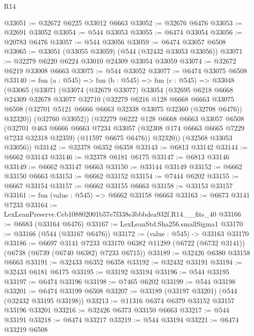 \begin{lexlean}{R14}
\begin{coremodule}
@33051 := @32672 @6225 @33012 @6663
@33052 := @32676 @6476
@33053 := @32691 @33052
@33054 := @544 @33053
@33055 := @6474 @33054
@33056 := @20783 @6476
@33057 := @544 @33056
@33059 := @6474 @33057 @6508
@33065 := @33051 (@33055 @33059) (@544 (@32432 @33053 @33056))
@33071 := @32279 @6220 @6224 @33010 @24309 @33054 @33059
@33074 := @32672 @6219 @33008 @6663
@33075 := @544 @33052
@33077 := @6474 @33075 @6508
@33140 := fun (a : @545) =>
  fun (b : @545) =>
  fun (c : @545) =>
  @33048
    (@33065
      (@33071
        (@33074
          (@32679 @33077)
          @33054
          (@32695
            @6218
            @6668
            @24309
            @32678
            @33077
            @32710
            (@32279
              @6216
              @128
              @6668
              @6663
              @33075
              @6508
              (@32701 @5121 @6666 @6663 @32338 @33075 @32360 (@32708 @6476))
              @32320))
          (@32760 @33052))
        (@32279
          @6222
          @128
          @6668
          @6663
          @33057
          @6508
          (@32701
            @463
            @6666
            @6663
            @7234
            @33057
            (@32308 @174 @6663 @6665 @7229 @7233 @32318 @32359)
            (@11597 @6675 @6476))
          @32320))
      (@32568 @33053 @33056))
@33142 := @32378 @6352 @6358
@33143 := @6813 @33142
@33144 := @6662 @33143
@33146 := @32378 @6181 @6175
@33147 := @6813 @33146
@33149 := @6662 @33147 @6663
@33150 := @33144 @33149
@33152 := @6662 @33150 @6663
@33153 := @6662 @33152
@33154 := @7444 @6202
@33155 := @6667 @33154
@33157 := @6662 @33155 @6663
@33158 := @33153 @33157
@33161 := fun (value : @545) => @6662 @33158 @6663
@33163 := @6673 @3141 @7233
@33164 := LexLeanPreserve.Ceb108802001b57e7f338e3bbbdea932f.R14.__fits_40
@33166 := @6683 (@33164 @6476)
@33167 := LexLeanStd.Sha256.smallSigma1
@33170 := @33166 (@544 (@33167 @6476))
@33172 := (value : @545) -> @33163 @33170
@33186 := @6697
    @3141
    @7233
    @33170
    @6382
    @11289
    (@6722 (@6732 @3141))
    (@6738 (@6739 (@6740 @6382) @7233 @6715))
@33189 := @32426 @6380 @33158 @6663
@33191 := @32433 @6352 @6358
@33192 := @32432 @33191
@33194 := @32433 @6181 @6175
@33195 := @33192 @33194
@33196 := @544 @33195
@33197 := @6474 @33196
@33198 := @7465 @6202
@33199 := @544 @33198
@33201 := @6474 @33199 @6508
@33207 := @33189 (@33197 @33201) (@544 (@32432 @33195 @33198))
@33213 := @11316 @6374 @6379 @33152 @33157 @33196 @33201
@33216 := @32426 @6373 @33150 @6663
@33217 := @544 @33191
@33218 := @6474 @33217
@33219 := @544 @33194
@33221 := @6474 @33219 @6508

\end{coremodule}
\end{lexlean}
